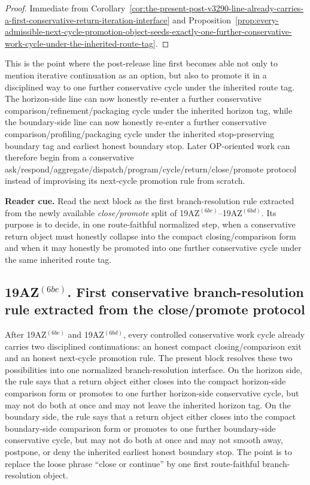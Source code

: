 \begin{proof}
Immediate from Corollary~\ref{cor:the-present-post-v3290-line-already-carries-a-first-conservative-return-iteration-interface} and Proposition~\ref{prop:every-admissible-next-cycle-promotion-object-seeds-exactly-one-further-conservative-work-cycle-under-the-inherited-route-tag}.
\end{proof}

\begin{remark}
\label{rem:what-the-first-admissible-next-cycle-promotion-rule-now-buys}
This is the point where the post-release line first becomes able not only to mention iterative continuation as an option, but also to promote it in a disciplined way to one further conservative cycle under the inherited route tag. The horizon-side line can now honestly re-enter a further conservative comparison/refinement/packaging cycle under the inherited horizon tag, while the boundary-side line can now honestly re-enter a further conservative comparison/profiling/packaging cycle under the inherited stop-preserving boundary tag and earliest honest boundary stop. Later OP-oriented work can therefore begin from a conservative ask/respond/aggregate/dispatch/program/cycle/return/close/promote protocol instead of improvising its next-cycle promotion rule from scratch.
\end{remark}


\noindent\textbf{Reader cue.} Read the next block as the first branch-resolution rule extracted from the newly available \emph{close/promote} split of 19AZ$^{(6bc)}$--19AZ$^{(6bd)}$. Its purpose is to decide, in one route-faithful normalized step, when a conservative return object must honestly collapse into the compact closing/comparison form and when it may honestly be promoted into one further conservative cycle under the same inherited route tag.

\subsection*{19AZ$^{(6be)}$. First conservative branch-resolution rule extracted from the close/promote protocol}
\label{sec:first-conservative-branch-resolution-rule-extracted-from-the-close-promote-protocol}
After 19AZ$^{(6bc)}$ and 19AZ$^{(6bd)}$, every controlled conservative work cycle already carries two disciplined continuations: an honest compact closing/comparison exit and an honest next-cycle promotion rule. The present block resolves these two possibilities into one normalized branch-resolution interface. On the horizon side, the rule says that a return object either closes into the compact horizon-side comparison form or promotes to one further horizon-side conservative cycle, but may not do both at once and may not leave the inherited horizon tag. On the boundary side, the rule says that a return object either closes into the compact boundary-side comparison form or promotes to one further boundary-side conservative cycle, but may not do both at once and may not smooth away, postpone, or deny the inherited earliest honest boundary stop. The point is to replace the loose phrase ``close or continue'' by one first route-faithful branch-resolution object.


